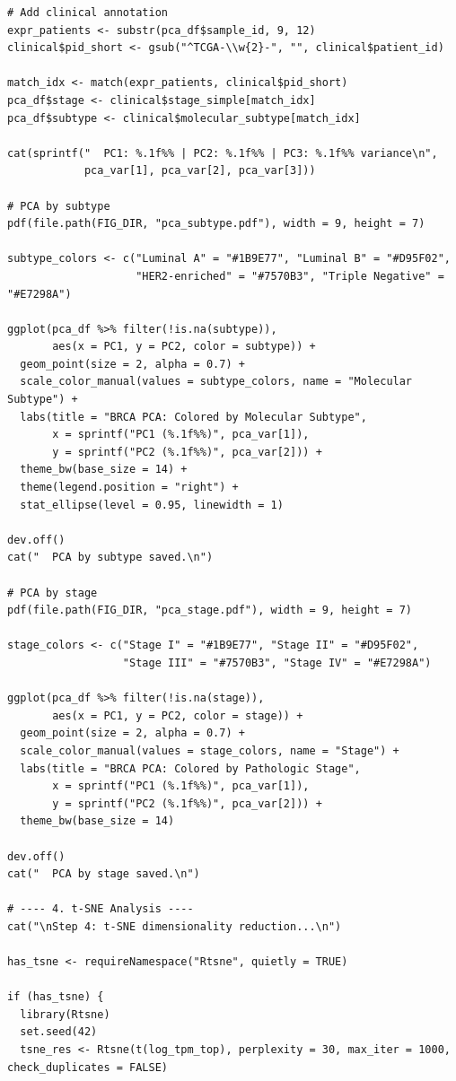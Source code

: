 \documentclass[12pt,a4paper]{ctexart}
\begin{document}
\begin{lstlisting}[caption={06_clustering}, basicstyle=\ttfamily\scriptsize]
# Add clinical annotation
expr_patients <- substr(pca_df$sample_id, 9, 12)
clinical$pid_short <- gsub("^TCGA-\\w{2}-", "", clinical$patient_id)

match_idx <- match(expr_patients, clinical$pid_short)
pca_df$stage <- clinical$stage_simple[match_idx]
pca_df$subtype <- clinical$molecular_subtype[match_idx]

cat(sprintf("  PC1: %.1f%% | PC2: %.1f%% | PC3: %.1f%% variance\n",
            pca_var[1], pca_var[2], pca_var[3]))

# PCA by subtype
pdf(file.path(FIG_DIR, "pca_subtype.pdf"), width = 9, height = 7)

subtype_colors <- c("Luminal A" = "#1B9E77", "Luminal B" = "#D95F02",
                    "HER2-enriched" = "#7570B3", "Triple Negative" = "#E7298A")

ggplot(pca_df %>% filter(!is.na(subtype)),
       aes(x = PC1, y = PC2, color = subtype)) +
  geom_point(size = 2, alpha = 0.7) +
  scale_color_manual(values = subtype_colors, name = "Molecular Subtype") +
  labs(title = "BRCA PCA: Colored by Molecular Subtype",
       x = sprintf("PC1 (%.1f%%)", pca_var[1]),
       y = sprintf("PC2 (%.1f%%)", pca_var[2])) +
  theme_bw(base_size = 14) +
  theme(legend.position = "right") +
  stat_ellipse(level = 0.95, linewidth = 1)

dev.off()
cat("  PCA by subtype saved.\n")

# PCA by stage
pdf(file.path(FIG_DIR, "pca_stage.pdf"), width = 9, height = 7)

stage_colors <- c("Stage I" = "#1B9E77", "Stage II" = "#D95F02",
                  "Stage III" = "#7570B3", "Stage IV" = "#E7298A")

ggplot(pca_df %>% filter(!is.na(stage)),
       aes(x = PC1, y = PC2, color = stage)) +
  geom_point(size = 2, alpha = 0.7) +
  scale_color_manual(values = stage_colors, name = "Stage") +
  labs(title = "BRCA PCA: Colored by Pathologic Stage",
       x = sprintf("PC1 (%.1f%%)", pca_var[1]),
       y = sprintf("PC2 (%.1f%%)", pca_var[2])) +
  theme_bw(base_size = 14)

dev.off()
cat("  PCA by stage saved.\n")

# ---- 4. t-SNE Analysis ----
cat("\nStep 4: t-SNE dimensionality reduction...\n")

has_tsne <- requireNamespace("Rtsne", quietly = TRUE)

if (has_tsne) {
  library(Rtsne)
  set.seed(42)
  tsne_res <- Rtsne(t(log_tpm_top), perplexity = 30, max_iter = 1000, check_duplicates = FALSE)


\end{lstlisting}
\end{document}
